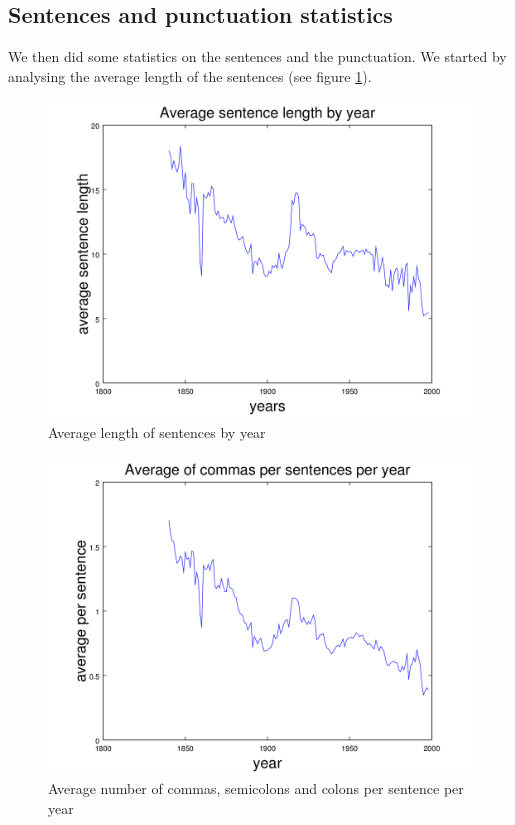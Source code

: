 \subsection{Sentences and punctuation statistics}

We then did some statistics on the sentences and the punctuation. We started by analysing the average length of the sentences (see figure  \ref{average_sent_length_figure}).

\begin{figure}[h!]
	\centering
    \includegraphics[scale=0.15]{Pictures/statistics/sentences-length/means.png}
    \caption{Average length of sentences by year}
    \label{average_sent_length_figure}\hfill
\end{figure}

\begin{figure}[h!]
	\centering
    \includegraphics[scale=0.15]{Pictures/statistics/punctuation/graph.png}
    \caption{Average number of commas, semicolons and colons per sentence per year}
    \label{average_punct}\hfill
\end{figure}

